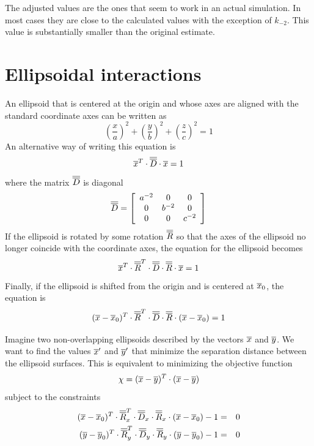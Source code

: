 \documentclass[12pt]{article}
\begin{document}
\noindent
The adjusted values are the ones that seem to work in an actual simulation. In most cases they are close
to the calculated values with the exception of $k_{-2}$. This value is substantially smaller than the
original estimate.

\section{Ellipsoidal interactions}
An ellipsoid that is centered at the origin and whose axes are aligned with the standard coordinate axes
can be written as
\[
\left(\frac{x}{a}\right)^2+\left(\frac{y}{b}\right)^2+\left(\frac{z}{c}\right)^2=1
\]
An alternative way of writing this equation is
\[
\overline{x}^T\cdot\overline{\overline{D}}\cdot\overline{x}=1
\]
where the matrix $\overline{\overline{D}}$ is diagonal
\[
\overline{\overline{D}} = \left[\begin{array}{ccc}
a^{-2} & 0 & 0 \\
0 & b^{-2} & 0 \\
0 & 0 & c^{-2}
\end{array}\right]
\]
If the ellipsoid is rotated by some rotation $\overline{\overline{R}}$ so that the axes of the ellipsoid no longer coincide
with the coordinate axes, the equation for the ellipsoid becomes
\[
\overline{x}^T\cdot\overline{\overline{R}}^{T}\cdot\overline{\overline{D}}\cdot\overline{\overline{R}}\cdot\overline{x} = 1
\]
Finally, if the ellipsoid is shifted from the origin and is centered at $\overline{x}_{0}$, the equation is
\[
(\overline{x}-\overline{x}_0)^T\cdot\overline{\overline{R}}^{T}\cdot\overline{\overline{D}}\cdot\overline{\overline{R}}\cdot(\overline{x}-\overline{x}_0) = 1
\]

Imagine two non-overlapping ellipsoids described by the vectors $\overline{x}$ and $\overline{y}$. We want to find the
values $\overline{x}'$ and $\overline{y}'$ that minimize the separation distance between the ellipsoid surfaces. This
is equivalent to minimizing the objective function
\[
\chi = (\overline{x}-\overline{y})^T\cdot(\overline{x}-\overline{y})
\]
subject to the constraints
\begin{eqnarray*}
(\overline{x}-\overline{x}_0)^T\cdot\overline{\overline{R}}_x^{T}\cdot\overline{\overline{D}}_x\cdot\overline{\overline{R}}_x\cdot(\overline{x}-\overline{x}_0)-1 & = & 0 \\
(\overline{y}-\overline{y}_0)^T\cdot\overline{\overline{R}}_y^{T}\cdot\overline{\overline{D}}_y\cdot\overline{\overline{R}}_y\cdot(\overline{y}-\overline{y}_0)-1 & = & 0
\end{eqnarray*}
\end{document}
